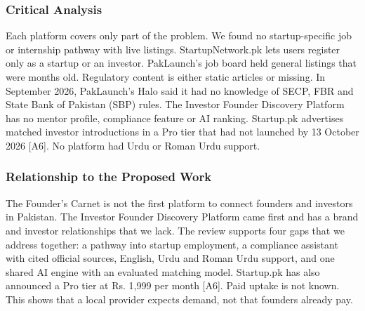 \documentclass{FastFyp}
\newcommand{\src}[1]{[#1]}
\begin{document}
\subsubsection{Critical Analysis}
Each platform covers only part of the problem. We found no startup-specific job or internship pathway with live listings. StartupNetwork.pk lets users register only as a startup or an investor. PakLaunch's job board held general listings that were months old. Regulatory content is either static articles or missing. In September 2026, PakLaunch's Halo said it had no knowledge of SECP, FBR and State Bank of Pakistan (SBP) rules. The Investor Founder Discovery Platform has no mentor profile, compliance feature or AI ranking. Startup.pk advertises matched investor introductions in a Pro tier that had not launched by 13 October 2026 \src{A6}. No platform had Urdu or Roman Urdu support.

\subsubsection{Relationship to the Proposed Work}
The Founder's Carnet is not the first platform to connect founders and investors in Pakistan. The Investor Founder Discovery Platform came first and has a brand and investor relationships that we lack. The review supports four gaps that we address together: a pathway into startup employment, a compliance assistant with cited official sources, English, Urdu and Roman Urdu support, and one shared AI engine with an evaluated matching model. Startup.pk has also announced a Pro tier at Rs. 1,999 per month \src{A6}. Paid uptake is not known. This shows that a local provider expects demand, not that founders already pay.
\end{document}
